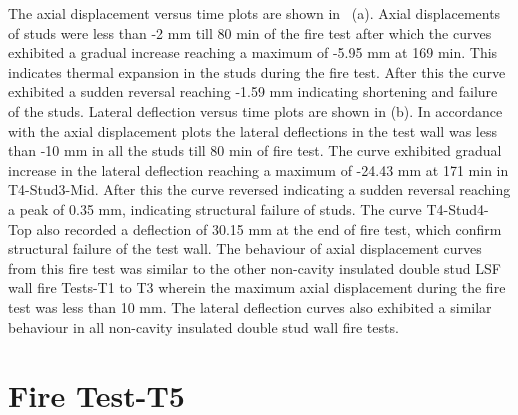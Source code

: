The axial displacement versus time plots are shown in ~(a). Axial displacements of studs were less than -2 mm till 80 min of the fire test after which the curves exhibited a gradual increase reaching a maximum of -5.95 mm at 169 min. This indicates thermal expansion in the studs during the fire test. After this the curve exhibited a sudden reversal reaching -1.59 mm indicating shortening and failure of the studs. Lateral deflection versus time plots are shown in  (b). In accordance with the axial displacement plots the lateral deflections in the test wall was less than -10 mm in all the studs till 80 min of fire test. The curve exhibited gradual increase in the lateral deflection reaching a maximum of -24.43 mm at 171 min in T4-Stud3-Mid. After this the curve reversed indicating a sudden reversal reaching a peak of 0.35 mm, indicating structural failure of studs. The curve T4-Stud4-Top also recorded a deflection of 30.15 mm at the end of fire test, which confirm structural failure of the test wall. The behaviour of axial displacement curves from this fire test was similar to the other non-cavity insulated double stud LSF wall fire Tests-T1 to T3 wherein the maximum axial displacement during the fire test was less than 10 mm. The lateral deflection curves also exhibited a similar behaviour in all non-cavity insulated double stud wall fire tests.

\section{Fire Test-T5}

